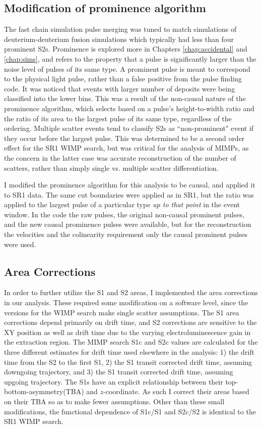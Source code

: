 \subsection{Modification of prominence algorithm}
The fast chain simulation pulse merging was tuned to match simulations of deuterium-deuterium fusion simulations which typically had less than four prominent S2s. Prominence is explored more in Chapters \ref{chap:accidental} and \ref{chap:sims}, and refers to the property that a pulse is significantly larger than the noise level of pulses of its same type.
A prominent pulse is meant to correspond to the physical light pulse, rather than a false positive from the pulse finding code.
It was noticed that events with larger number of deposits were being classified into the lower bins.
This was a result of the non-causal nature of the prominence algorithm, which selects based on a pulse's height-to-width ratio and the ratio of its area to the largest pulse of its same type, regardless of the ordering.
Multiple scatter events tend to classify S2s as ``non-prominent" event if they occur before the largest pulse.
This was determined to be a second order effect for the SR1 WIMP search, but was critical for the analysis of MIMPs, as the concern in the latter case was accurate reconstruction of the number of scatters, rather than simply single vs. multiple scatter differentiation.

I modified the prominence algorithm for this analysis to be causal, and applied it to SR1 data.
The same cut boundaries were applied as in SR1, but the ratio was applied to the largest pulse of a particular type \textit{up to that point} in the event window.
In the code the raw pulses, the original non-causal prominent pulses, and the new causal prominence pulses were available, but for the reconstruction the velocities and the colinearity requirement only the causal prominent pulses were used.

\subsection{Area Corrections}

In order to further utilize the S1 and S2 areas, I implemented the area corrections in our analysis.
These required some modification on a software level, since the versions for the WIMP search make single scatter assumptions.
The S1 area corrections depend primarily on drift time, and S2 corrections are sensitive to the XY position as well as drift time due to the varying electroluminescence gain in the extraction region.
The MIMP search S1c and S2c values are calculated for the three different estimates for drift time used elsewhere in the analysis: 1) the drift time from the S2 to the first S1, 2) the S1 transit corrected drift time, assuming downgoing trajectory, and 3) the S1 transit corrected drift time, assuming upgoing trajectory.
The S1s have an explicit relationship between their top-bottom-asymmetry(TBA) and $z$-coordinate. 
As such I correct their areas based on their TBA so as to make fewer assumptions.
Other than these small modifications, the functional dependence of S1c/S1 and S2c/S2 is identical to the SR1 WIMP search.

